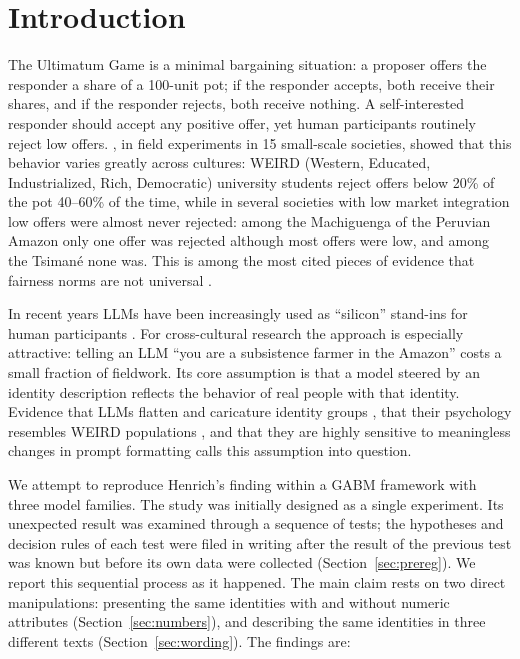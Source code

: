 \documentclass[11pt]{article}
\begin{document}
\section{Introduction}

The Ultimatum Game \citep{guth1982} is a minimal bargaining situation: a proposer offers the responder a share of a 100-unit pot; if the responder accepts, both receive their shares, and if the responder rejects, both receive nothing. A self-interested responder should accept any positive offer, yet human participants routinely reject low offers. \citet{henrich2001}, in field experiments in 15 small-scale societies, showed that this behavior varies greatly across cultures: WEIRD (Western, Educated, Industrialized, Rich, Democratic) university students reject offers below 20\% of the pot 40--60\% of the time, while in several societies with low market integration low offers were almost never rejected: among the Machiguenga of the Peruvian Amazon only one offer was rejected although most offers were low, and among the Tsiman\'e none was. This is among the most cited pieces of evidence that fairness norms are not universal \citep{henrich2010}.

In recent years LLMs have been increasingly used as ``silicon'' stand-ins for human participants \citep{argyle2023,horton2023,aher2023,park2023}. For cross-cultural research the approach is especially attractive: telling an LLM ``you are a subsistence farmer in the Amazon'' costs a small fraction of fieldwork. Its core assumption is that a model steered by an identity description reflects the behavior of real people with that identity. Evidence that LLMs flatten and caricature identity groups \citep{cheng2023compost,wang2025misportray}, that their psychology resembles WEIRD populations \citep{atari2023which}, and that they are highly sensitive to meaningless changes in prompt formatting \citep{sclar2024quantifying} calls this assumption into question.

We attempt to reproduce Henrich's finding within a GABM framework with three model families. The study was initially designed as a single experiment. Its unexpected result was examined through a sequence of tests; the hypotheses and decision rules of each test were filed in writing after the result of the previous test was known but before its own data were collected (Section~\ref{sec:prereg}). We report this sequential process as it happened. The main claim rests on two direct manipulations: presenting the same identities with and without numeric attributes (Section~\ref{sec:numbers}), and describing the same identities in three different texts (Section~\ref{sec:wording}). The findings are:
\end{document}
